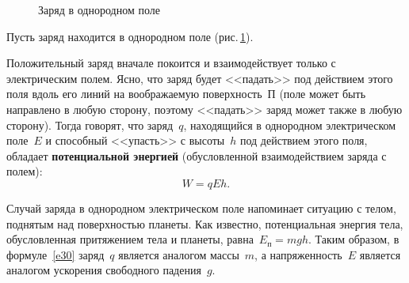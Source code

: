 \documentclass[main.tex]{subfiles}
\begin{document}
{%
\setlength\intextsep{0pt}
\begin{figure}
    \centering
    \caption{Заряд в однородном поле}
    \label{fig:p101}
\end{figure}


Пусть заряд находится в однородном поле (рис.\,\ref{fig:p101}).














Положительный заряд вначале покоится и взаимодействует только с электрическим полем. Ясно, что заряд будет <<падать>> под действием этого поля вдоль его линий на воображаемую поверхность~П (поле может быть направлено в любую сторону, поэтому <<падать>> заряд может также в любую сторону). Тогда говорят, что заряд~$q$, находящийся в однородном электрическом поле~$E$ и способный <<упасть>> с высоты~$h$ под действием этого поля, обладает \textbf{потенциальной энергией} (обусловленной взаимодействием заряда с полем):
\begin{equation}
    \label{e30}
    W=qEh.
\end{equation}

}

Случай заряда в однородном электрическом поле напоминает ситуацию с телом, поднятым над поверхностью планеты. Как известно, потенциальная энергия тела, обусловленная притяжением тела и планеты, равна~$E_\text{п}=mgh$. Таким образом, в формуле~\eqref{e30} заряд~$q$ является аналогом массы~$m$, а напряженность~$E$ является аналогом ускорения свободного падения~$g$. 
\end{document}
